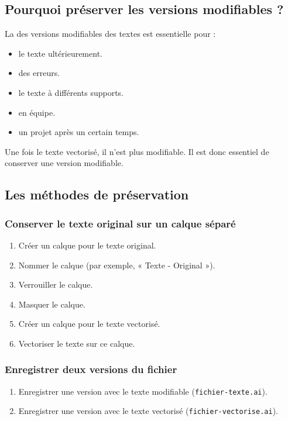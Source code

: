 \subsection{Pourquoi préserver les versions modifiables ?}

La  des versions modifiables des textes est essentielle pour :

\begin{itemize}
    \item {} le texte ultérieurement.
    \item {} des erreurs.
    \item {} le texte à différents supports.
    \item {} en équipe.
    \item {} un projet après un certain temps.
\end{itemize}

Une fois le texte vectorisé, il n'est plus modifiable. Il est donc essentiel de conserver une version modifiable.

\subsection{Les méthodes de préservation}

\subsubsection{Conserver le texte original sur un calque séparé}

\begin{enumerate}
    \item Créer un calque pour le texte original.
    \item Nommer le calque (par exemple, « Texte - Original »).
    \item Verrouiller le calque.
    \item Masquer le calque.
    \item Créer un calque pour le texte vectorisé.
    \item Vectoriser le texte sur ce calque.
\end{enumerate}

\subsubsection{Enregistrer deux versions du fichier}

\begin{enumerate}
    \item Enregistrer une version avec le texte modifiable (\texttt{fichier-texte.ai}).
    \item Enregistrer une version avec le texte vectorisé (\texttt{fichier-vectorise.ai}).
\end{enumerate}

